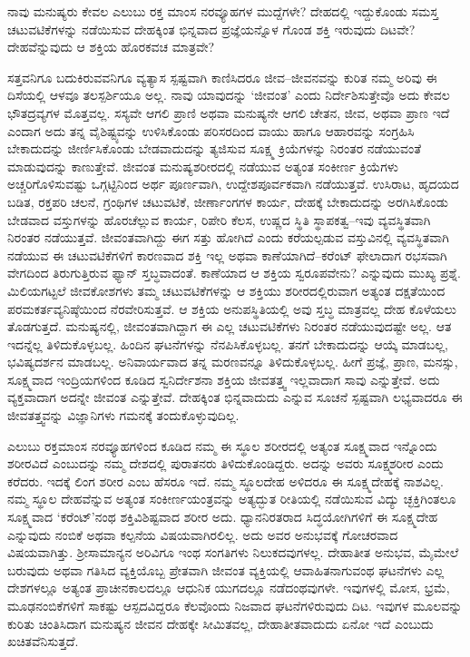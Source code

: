 ನಾವು ಮನುಷ್ಯರು ಕೇವಲ ಎಲುಬು ರಕ್ತ ಮಾಂಸ ನರವ್ಯೂಹಗಳ ಮುದ್ದೆಗಳೇ? ದೇಹದಲ್ಲಿ ಇದ್ದುಕೊಂಡು ಸಮಸ್ತ ಚಟುವಟಿಕೆಗಳನ್ನು ನಡೆಯಿಸುವ ದೇಹಕ್ಕಿಂತ ಭಿನ್ನವಾದ ಪ್ರಜ್ಞೆಯನ್ನೊಳ ಗೊಂಡ ಶಕ್ತಿ ಇರುವುದು ದಿಟವೇ? ದೇಹವೆನ್ನುವುದು ಆ ಶಕ್ತಿಯ ಹೊರಕವಚ ಮಾತ್ರವೇ?

ಸತ್ತವನಿಗೂ ಬದುಕಿರುವವನಿಗೂ ವ್ಯತ್ಯಾಸ ಸ್ಪಷ್ಟವಾಗಿ ಕಾಣಿಸಿದರೂ ಜೀವ–ಜೀವನವನ್ನು ಕುರಿತ ನಮ್ಮ ಅರಿವು ಈ ದಿಸೆಯಲ್ಲಿ ಆಳವೂ ತಲಸ್ಪರ್ಶಿಯೂ ಅಲ್ಲ. ನಾವು ಯಾವುದನ್ನು ‘ಜೀವಂತ’ ಎಂದು ನಿರ್ದೇಶಿಸುತ್ತೇವೊ ಅದು ಕೇವಲ ಭೌತದ್ರವ್ಯಗಳ ಮೊತ್ತವಲ್ಲ. ಸಸ್ಯವೇ ಆಗಲಿ ಪ್ರಾಣಿ ಅಥವಾ ಮನುಷ್ಯನೇ ಆಗಲಿ ಚೇತನ, ಜೀವ, ಅಥವಾ ಪ್ರಾಣ ಇದೆ ಎಂದಾಗ ಅದು ತನ್ನ ವೈಶಿಷ್ಟ್ಯವನ್ನು ಉಳಿಸಿಕೊಂಡು ಪರಿಸರದಿಂದ ವಾಯು ಹಾಗೂ ಆಹಾರವನ್ನು ಸಂಗ್ರಹಿಸಿ ಬೇಕಾದುದನ್ನು ಜೀರ್ಣಿಸಿಕೊಂಡು ಬೇಡವಾದುದನ್ನು ತ್ಯಜಿಸುವ ಸೂಕ್ಷ್ಮ ಕ್ರಿಯೆಗಳನ್ನು ನಿರಂತರ ನಡೆಯುವಂತೆ ಮಾಡುವುದನ್ನು ಕಾಣುತ್ತೇವೆ. ಜೀವಂತ ಮನುಷ್ಯಶರೀರದಲ್ಲಿ ನಡೆಯುವ ಅತ್ಯಂತ ಸಂಕೀರ್ಣ ಕ್ರಿಯೆಗಳು ಅಚ್ಚರಿಗೊಳಿಸುವಷ್ಟು ಒಗ್ಗಟ್ಟಿನಿಂದ ಅರ್ಥ ಪೂರ್ಣವಾಗಿ, ಉದ್ದೇಶಪೂರ್ವಕವಾಗಿ ನಡೆಯುತ್ತವೆ. ಉಸಿರಾಟ, ಹೃದಯದ ಬಡಿತ, ರಕ್ತಪರಿ ಚಲನೆ, ಗ್ರಂಥಿಗಳ ಚಟುವಟಿಕೆ, ಜೀರ್ಣಾಂಗಗಳ ಕಾರ್ಯ, ದೇಹಕ್ಕೆ ಬೇಕಾದುದನ್ನು ಅರಗಿಸಿಕೊಂಡು ಬೇಡವಾದ ವಸ್ತುಗಳನ್ನು ಹೊರಚೆಲ್ಲುವ ಕಾರ್ಯ, ರಿಪೇರಿ ಕೆಲಸ, ಉಷ್ಣದ ಸ್ಥಿತಿ ಸ್ಥಾಪಕತ್ವ–ಇವು ವ್ಯವಸ್ಥಿತವಾಗಿ ನಿರಂತರ ನಡೆಯುತ್ತವೆ. ಜೀವಂತವಾಗಿದ್ದು ಈಗ ಸತ್ತು ಹೋಗಿದೆ ಎಂದು ಕರೆಯಲ್ಪಡುವ ವಸ್ತುವಿನಲ್ಲಿ ವ್ಯವಸ್ಥಿತವಾಗಿ ನಡೆಯುವ ಈ ಚಟುವಟಿಕೆಗಳಿಗೆ ಕಾರಣವಾದ ಶಕ್ತಿ ಇಲ್ಲ ಅಥವಾ ಕಾಣೆಯಾಗಿದೆ–ಕರೆಂಟ್ ಫೇಲಾದಾಗ ರಭಸವಾಗಿ ವೇಗದಿಂದ ತಿರುಗುತ್ತಿರುವ ಫ್ಯಾನ್ ಸ್ತಬ್ಧವಾದಂತೆ. ಕಾಣೆಯಾದ ಆ ಶಕ್ತಿಯ ಸ್ವರೂಪವೇನು? ಎನ್ನುವುದು ಮುಖ್ಯ ಪ್ರಶ್ನೆ. ಮಿಲಿಯಗಟ್ಟಲೆ ಜೀವಕೋಶಗಳು ತಮ್ಮ ಚಟುವಟಿಕೆಗಳನ್ನು ಆ ಶಕ್ತಿಯು ಶರೀರದಲ್ಲಿರುವಾಗ ಅತ್ಯಂತ ದಕ್ಷತೆಯಿಂದ ಪರಮಕರ್ತವ್ಯನಿಷ್ಠೆಯಿಂದ ನೆರವೇರಿಸುತ್ತವೆ. ಆ ಶಕ್ತಿಯ ಅನುಪಸ್ಥಿತಿಯಲ್ಲಿ ಅವು ಸ್ತಬ್ಧ ಮಾತ್ರವಲ್ಲ ದೇಹ ಕೊಳೆಯಲು ತೊಡಗುತ್ತದೆ. ಮನುಷ್ಯನಲ್ಲಿ, ಜೀವಂತವಾಗಿದ್ದಾಗ ಈ ಎಲ್ಲ ಚಟುವಟಿಕೆಗಳು ನಿರಂತರ ನಡೆಯುವುದಷ್ಟೇ ಅಲ್ಲ. ಆತ ಇದನ್ನೆಲ್ಲ ತಿಳಿದುಕೊಳ್ಳಬಲ್ಲ. ಹಿಂದಿನ ಘಟನೆಗಳನ್ನು ನೆನಪಿಸಿಕೊಳ್ಳಬಲ್ಲ. ತನಗೆ ಬೇಕಾದುದನ್ನು ಆಯ್ಕೆ ಮಾಡಬಲ್ಲ, ಭವಿಷ್ಯದರ್ಶನ ಮಾಡಬಲ್ಲ. ಅನಿವಾರ್ಯವಾದ ತನ್ನ ಮರಣವನ್ನೂ ತಿಳಿದುಕೊಳ್ಳಬಲ್ಲ. ಹೀಗೆ ಪ್ರಜ್ಞೆ, ಪ್ರಾಣ, ಮನಸ್ಸು, ಸೂಕ್ಷ್ಮವಾದ ಇಂದ್ರಿಯಗಳಿಂದ ಕೂಡಿದ ಸ್ವನಿರ್ದೇಶನಾ ಶಕ್ತಿಯ ಜೀವತತ್ತ್ವ ಇಲ್ಲವಾದಾಗ ಸಾವು ಎನ್ನುತ್ತೇವೆ. ಅದು ವ್ಯಕ್ತವಾದಾಗ ಅದನ್ನೇ ಜೀವಂತ ಎನ್ನುತ್ತೇವೆ. ದೇಹಕ್ಕಿಂತ ಭಿನ್ನವಾದುದು ಎನ್ನುವ ಸೂಚನೆ ಸ್ಪಷ್ಟವಾಗಿ ಲಭ್ಯವಾದರೂ ಈ ಜೀವತತ್ತ್ವವನ್ನು ವಿಜ್ಞಾನಿಗಳು ಗಮನಕ್ಕೆ ತಂದುಕೊಳ್ಳುವುದಿಲ್ಲ.

ಎಲುಬು ರಕ್ತಮಾಂಸ ನರವ್ಯೂಹಗಳಿಂದ ಕೂಡಿದ ನಮ್ಮ ಈ ಸ್ಥೂಲ ಶರೀರದಲ್ಲಿ ಅತ್ಯಂತ ಸೂಕ್ಷ್ಮವಾದ ಇನ್ನೊಂದು ಶರೀರವಿದೆ ಎಂಬುದನ್ನು ನಮ್ಮ ದೇಶದಲ್ಲಿ ಪುರಾತನರು ತಿಳಿದುಕೊಂಡಿದ್ದರು. ಅದನ್ನು ಅವರು ಸೂಕ್ಷ್ಮಶರೀರ ಎಂದು ಕರೆದರು. ಇದಕ್ಕೆ ಲಿಂಗ ಶರೀರ ಎಂಬ ಹೆಸರೂ ಇದೆ. ನಮ್ಮ ಸ್ಥೂಲದೇಹ ಅಳಿದರೂ ಈ ಸೂಕ್ಷ್ಮದೇಹಕ್ಕೆ ನಾಶವಿಲ್ಲ. ನಮ್ಮ ಸ್ಥೂಲ ದೇಹವೆನ್ನುವ ಅತ್ಯಂತ ಸಂಕೀರ್ಣಯಂತ್ರವನ್ನು ಅತ್ಯದ್ಭುತ ರೀತಿಯಲ್ಲಿ ನಡೆಯಿಸುವ ವಿದ್ಯು ಚ್ಛಕ್ತಿಗಿಂತಲೂ ಸೂಕ್ಷ್ಮವಾದ ‘ಕರೆಂಟ್​’ನಂಥ ಶಕ್ತಿವಿಶಿಷ್ಟವಾದ ಶರೀರ ಅದು. ಧ್ಯಾನನಿರತರಾದ ಸಿದ್ಧಯೋಗಿಗಳಿಗೆ ಈ ಸೂಕ್ಷ್ಮದೇಹ ಎನ್ನುವುದು ನಂಬಿಕೆ ಅಥವಾ ಕಲ್ಪನೆಯ ವಿಷಯವಾಗಿರಲಿಲ್ಲ. ಅದು ಅವರ ಅನುಭವಕ್ಕೆ ಗೋಚರವಾದ ವಿಷಯವಾಗಿತ್ತು. ಶ‍್ರೀಸಾಮಾನ್ಯನ ಅರಿವಿಗೂ ಇಂಥ ಸಂಗತಿಗಳು ನಿಲುಕದವುಗಳಲ್ಲ. ದೇಹಾತೀತ ಅನುಭವ, ಮೈಮೇಲೆ ಬರುವುದು ಅಥವಾ ಗತಿಸಿದ ವ್ಯಕ್ತಿಯೊಬ್ಬ ಪ್ರೇತವಾಗಿ ಜೀವಂತ ವ್ಯಕ್ತಿಯಲ್ಲಿ ಆವಾಹಿತನಾಗುವಂಥ ಘಟನೆಗಳು ಎಲ್ಲ ದೇಶಗಳಲ್ಲೂ ಅತ್ಯಂತ ಪ್ರಾಚೀನಕಾಲದಲ್ಲೂ ಆಧುನಿಕ ಯುಗದಲ್ಲೂ ನಡೆದಂಥವುಗಳೇ. ಇವುಗಳಲ್ಲಿ ಮೋಸ, ಭ್ರಮೆ, ಮೂಢನಂಬಿಕೆಗಳಿಗೆ ಸಾಕಷ್ಟು ಆಸ್ಪದವಿದ್ದರೂ ಕೆಲವೊಂದು ನಿಜವಾದ ಘಟನೆಗಳಿರುವುದು ದಿಟ. ಇವುಗಳ ಮೂಲವನ್ನು ಕುರಿತು ಚಿಂತಿಸಿದಾಗ ಮನುಷ್ಯನ ಜೀವನ ದೇಹಕ್ಕೇ ಸೀಮಿತವಲ್ಲ, ದೇಹಾತೀತವಾದುದು ಏನೋ ಇದೆ ಎಂಬುದು ಖಚಿತವೆನಿಸುತ್ತದೆ.

